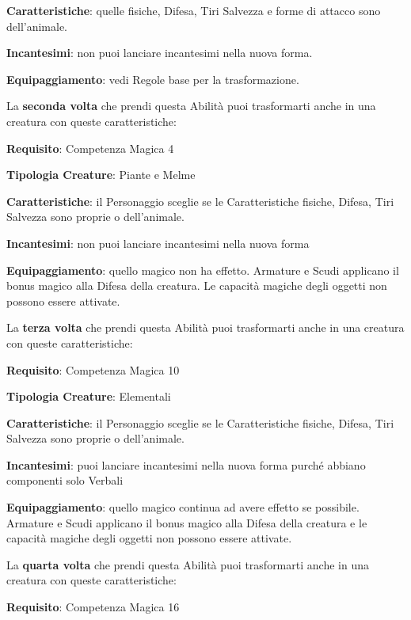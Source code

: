 \begin{multicols}{2}
\textbf{Caratteristiche}: quelle fisiche, Difesa, Tiri Salvezza e forme di attacco sono dell'animale.

\textbf{Incantesimi}: non puoi lanciare incantesimi nella nuova forma.

\textbf{Equipaggiamento}: vedi Regole base per la trasformazione.

\medskip

La \textbf{seconda volta} che prendi questa Abilità puoi trasformarti anche in una creatura con queste caratteristiche:

\medskip

\textbf{Requisito}: Competenza Magica 4

\textbf{Tipologia Creature}: Piante e Melme

\textbf{Caratteristiche}: il Personaggio sceglie se le Caratteristiche fisiche, Difesa, Tiri Salvezza sono proprie o dell'animale.

\textbf{Incantesimi}: non puoi lanciare incantesimi nella nuova forma

\textbf{Equipaggiamento}: quello magico non ha effetto. Armature e Scudi applicano il bonus magico alla Difesa della creatura. Le capacità magiche degli oggetti non possono essere attivate.

\medskip

La \textbf{terza volta} che prendi questa Abilità puoi trasformarti anche in una creatura con queste caratteristiche:

\medskip

\textbf{Requisito}: Competenza Magica 10

\textbf{Tipologia Creature}: Elementali

\textbf{Caratteristiche}: il Personaggio sceglie se le Caratteristiche fisiche, Difesa, Tiri Salvezza sono proprie o dell'animale.

\textbf{Incantesimi}: puoi lanciare incantesimi nella nuova forma purché abbiano componenti solo Verbali

\textbf{Equipaggiamento}: quello magico continua ad avere effetto se possibile. Armature e Scudi applicano il bonus magico alla Difesa della creatura e le capacità magiche degli oggetti non possono essere attivate.

\medskip

La \textbf{quarta volta} che prendi questa Abilità puoi trasformarti anche in una creatura con queste caratteristiche:

\medskip

\textbf{Requisito}: Competenza Magica 16


\end{multicols}
